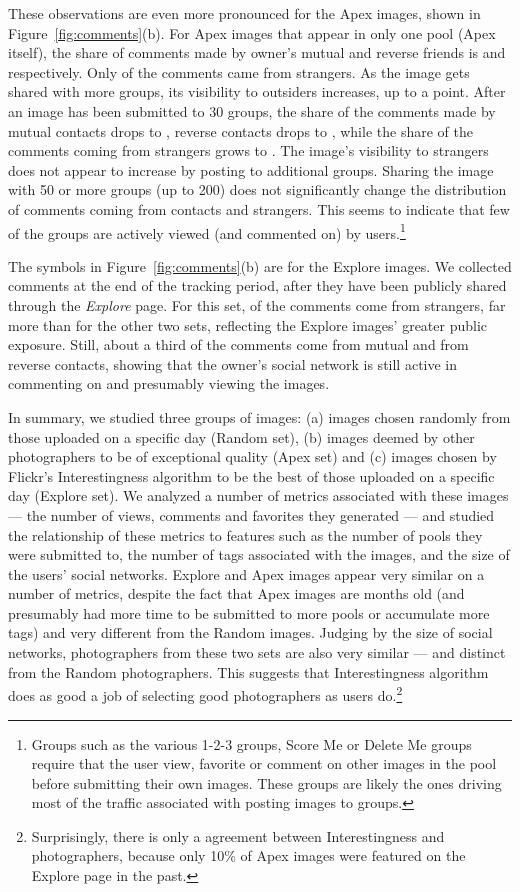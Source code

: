 \documentclass[]{article}
\newcommand{\source}[1]{\textsf{#1}}
\newcommand{\figref}[1]{Figure~\ref{#1}}
\begin{document}
These observations are even more pronounced for the \source{Apex}
images, shown in \figref{fig:comments}(b). For \source{Apex} images
that appear in only one pool (\source{Apex} itself), the share of
comments made by owner's mutual and reverse friends is
 and  respectively. Only  of the comments came
from strangers. As the image gets shared with more groups, its
visibility to outsiders increases, up to a point. After an image has
been submitted to 30 groups, the share of the comments made by
mutual contacts drops to , reverse contacts drops to ,
while the share of the comments coming from strangers grows to
. The image's visibility to strangers does not appear to
increase by posting to additional groups. Sharing the image with 50
or more groups (up to 200) does not significantly change the
distribution of comments coming from contacts and strangers. This
seems to indicate that few of the groups are actively viewed (and
commented on) by users.\footnote{Groups such as the various 1-2-3
groups, Score Me or Delete Me groups require that the user view,
favorite or comment on other images in the pool before submitting
their own images. These groups are likely the ones driving most of
the traffic associated with posting images to groups.}

The symbols in \figref{fig:comments}(b) are for the \source{Explore}
images. We collected comments at the end of the tracking period,
after they have been publicly shared through the \emph{Explore} page. For
this set,  of the comments come from strangers, far more than
for the other two sets, reflecting the \source{Explore} images'
greater public exposure. Still, about a third of the comments come
from mutual and  from reverse contacts, showing that the
owner's social network is still active in commenting on and
presumably viewing the images.

In summary, we studied three groups of images: (a) images chosen
randomly from those uploaded on a specific day (\source{Random}
set), (b) images deemed by other photographers to be of exceptional
quality (\source{Apex} set) and (c) images chosen by Flickr's
Interestingness algorithm to be the best of those uploaded on a
specific day (\source{Explore} set). We analyzed a number of metrics
associated with these images --- the number of views, comments and
favorites they generated --- and studied the relationship of these
metrics to features such as the number of pools they were submitted
to, the number of tags associated with the images, and the size of
the users' social networks. \source{Explore} and \source{Apex}
images appear very similar on a number of metrics, despite the fact
that \source{Apex} images are months old (and presumably had more
time to be submitted to more pools or accumulate more tags) and very
different from the \source{Random} images. Judging by the size of
social networks, photographers from these two sets are also very
similar --- and distinct from the \source{Random} photographers.
This suggests that Interestingness algorithm does as good a job of
selecting good photographers as users do.\footnote{Surprisingly,
there is only a  agreement between Interestingness and
photographers, because only 10\% of \source{Apex} images were
featured on the Explore page in the past.}
\end{document}

